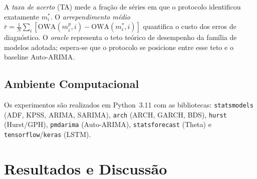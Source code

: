 \documentclass[12pt, a4paper]{article}
\begin{document}
A \textit{taxa de acerto} (TA) mede a fração de séries em que o protocolo
identificou exatamente $m^*_i$. O \textit{arrependimento médio}
$\bar{r} = \frac{1}{N}\sum_i [\text{OWA}(m^p_i, i) - \text{OWA}(m^*_i, i)]$
quantifica o custo dos erros de diagnóstico. O \textit{oracle} representa o teto teórico de desempenho da família de
modelos adotada; espera-se que o protocolo se posicione entre esse teto
e o baseline Auto-ARIMA.

%

\subsection{Ambiente Computacional}

Os experimentos são realizados em Python~3.11 com as bibliotecas:
\texttt{stats\-models} (ADF, KPSS, ARIMA, SARIMA), \texttt{arch} (ARCH, GARCH,
BDS), \texttt{hurst} (Hurst/GPH), \texttt{pmdarima} (Auto-ARIMA),
\texttt{stats\-forecast} (Theta) e \texttt{tensor\-flow}/\texttt{keras} (LSTM).

\section{Resultados e Discussão}


%
\end{document}
